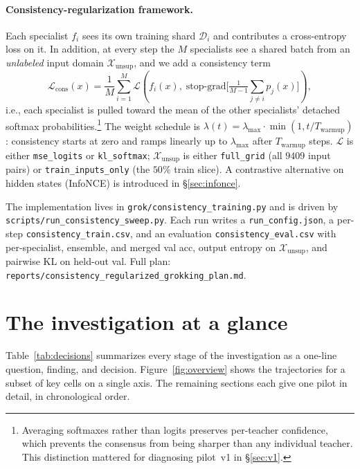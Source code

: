 \documentclass[11pt,a4paper]{article}
\begin{document}
\paragraph{Consistency-regularization framework.}
Each specialist $f_i$ sees its own training shard $\mathcal{D}_i$ and
contributes a cross-entropy loss on it. In addition, at every step the
$M$ specialists see a shared batch from an \emph{unlabeled} input
domain $\mathcal{X}_\text{unsup}$, and we add a consistency term
\[
  \mathcal{L}_\text{cons}(x) = \frac{1}{M}\sum_{i=1}^{M}
    \mathcal{L}\!\left(f_i(x),\; \mathrm{stop\text{-}grad}\Big[\tfrac{1}{M-1}\!\sum_{j\neq i} p_j(x)\Big]\right),
\]
i.e., each specialist is pulled toward the mean of the other
specialists' detached softmax probabilities.\footnote{Averaging
softmaxes rather than logits preserves per-teacher confidence, which
prevents the consensus from being sharper than any individual teacher.
This distinction mattered for diagnosing pilot~v1 in
\S\ref{sec:v1}.} The weight schedule is $\lambda(t) =
\lambda_\text{max}\cdot\min(1, t/T_\text{warmup})$: consistency starts
at zero and ramps linearly up to $\lambda_\text{max}$ after
$T_\text{warmup}$ steps. $\mathcal{L}$ is either \texttt{mse\_logits}
or \texttt{kl\_softmax}; $\mathcal{X}_\text{unsup}$ is either
\texttt{full\_grid} (all $9409$ input pairs) or
\texttt{train\_inputs\_only} (the $50\%$ train slice). A contrastive
alternative on hidden states (InfoNCE) is introduced in
\S\ref{sec:infonce}.

The implementation lives in \texttt{grok/consistency\_training.py} and
is driven by \texttt{scripts/run\_consistency\_sweep.py}. Each run
writes a \texttt{run\_config.json}, a per-step \texttt{consistency\_train.csv},
and an evaluation \texttt{consistency\_eval.csv} with per-specialist,
ensemble, and merged val acc, output entropy on
$\mathcal{X}_\text{unsup}$, and pairwise KL on held-out val. Full
plan: \texttt{reports/consistency\_regularized\_grokking\_plan.md}.

\section{The investigation at a glance}
\label{sec:glance}

Table~\ref{tab:decisions} summarizes every stage of the investigation
as a one-line question, finding, and decision.
Figure~\ref{fig:overview} shows the trajectories for a subset of key
cells on a single axis. The remaining sections each give one pilot in
detail, in chronological order.
\end{document}

